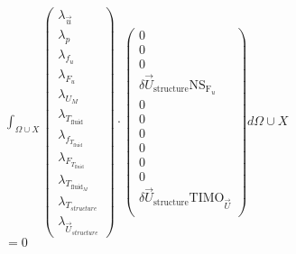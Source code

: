 \documentclass[10pt]{article} %
\begin{document}
\begin{center}
	$\int_{\Omega \cup X}
	\begin{pmatrix}
		\lambda_{\vec{u}} \\ \lambda_p \\ \lambda_{f_u} \\ \lambda_{F_u} \\ \lambda_{U_M}\\ \lambda_{T_{\text{fluid}}} \\ \lambda_{f_{T_{\text{fluid}}}} \\ \lambda_{F_{T_{\text{fluid}}}} \\ \lambda_{T_{\text{fluid}_M}} \\ \lambda_{T_{structure}} \\ \lambda_{\vec{U}_{structure}}
	\end{pmatrix}
	\cdot
	\begin{pmatrix}
		0 \\
		0 \\
		0 \\
		\delta \vec{U}_{\text{structure}} \text{NS}_{\text{F}_u} \\
		0 \\
		0 \\
		0 \\
		0 \\
		0 \\
		0 \\
		\delta \vec{U}_{\text{structure}} \text{TIMO}_{\vec{U}}\\
	\end{pmatrix}
	d\Omega \cup X $\\

	$=0$\\

	\newpage


\end{center}
\end{document}
